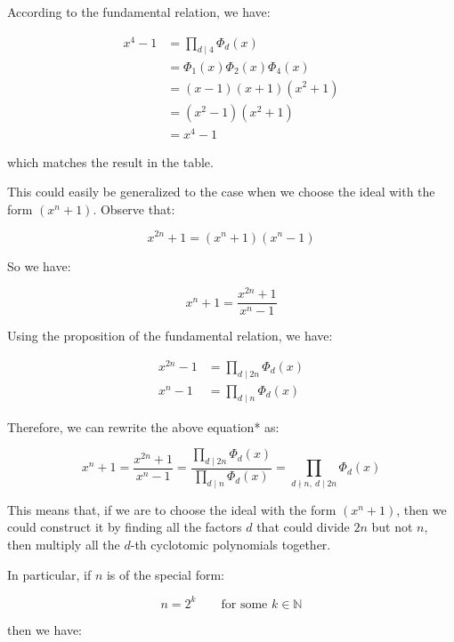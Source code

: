 \documentclass[12pt]{article}
\begin{document}
According to the fundamental relation, we have:

\begin{align*}
    x^4 - 1 
    &= \prod_{d \mid 4} \Phi_d(x) \\
    &= \Phi_1(x) \Phi_2(x) \Phi_4(x) \\
    &= (x - 1)(x + 1)(x^2 + 1) \\
    &= (x^2 - 1)(x^2 + 1) \\
    &= x^4 - 1
\end{align*}

which matches the result in the table.

This could easily be generalized to the case when we choose the ideal with the form $(x^n + 1)$.
Observe that:

\begin{equation*}
    x^{2n} + 1 = (x^n + 1)(x^n - 1)
\end{equation*}

So we have:

\begin{equation*}
    x^n + 1 = \frac{x^{2n} + 1}{x^n - 1}
\end{equation*}

Using the proposition of the fundamental relation, we have:

\begin{align*}
    x^{2n} - 1 &= \prod_{d \mid 2n} \Phi_d(x) \\
    x^n - 1 &= \prod_{d \mid n} \Phi_d(x) 
\end{align*}

Therefore, we can rewrite the above equation* as:

\begin{equation*}
    x^n + 1 
    = \frac{x^{2n} + 1}{x^n - 1} 
    = \frac{\prod_{d \mid 2n} \Phi_d(x)}{\prod_{d \mid n} \Phi_d(x)}
    = \prod_{d \nmid n, \ d \mid 2n} \Phi_d(x)
\end{equation*}

This means that, if we are to choose the ideal with the form $(x^n + 1)$, 
then we could construct it by finding all the factors $d$ that could divide $2n$ but not $n$, 
then multiply all the $d$-th cyclotomic polynomials together.

In particular, if $n$ is of the special form:

\begin{equation*}
    n = 2^k \qquad \text{for some } k \in \mathbb{N}
\end{equation*}

then we have:
\end{document}
